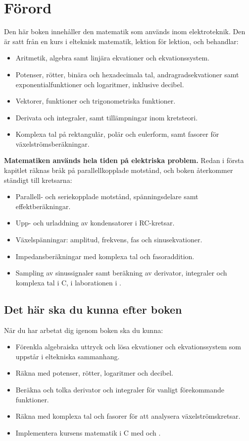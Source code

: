 
\chapter{Förord}

Den här boken innehåller den matematik som används inom elektroteknik. Den är satt från en kurs i
elteknisk matematik, lektion för lektion, och behandlar:
\begin{itemize}
  \item Aritmetik, algebra samt linjära ekvationer och ekvationssystem.
  \item Potenser, rötter, binära och hexadecimala tal, andragradsekvationer samt
    exponentialfunktioner och logaritmer, inklusive decibel.
  \item Vektorer, funktioner och trigonometriska funktioner.
  \item Derivata och integraler, samt tillämpningar inom kretsteori.
  \item Komplexa tal på rektangulär, polär och eulerform, samt fasorer för
    växelströmsberäkningar.
\end{itemize}

\textbf{Matematiken används hela tiden på elektriska problem.} Redan i första kapitlet räknas
bråk på parallellkopplade motstånd, och boken återkommer ständigt till kretsarna:
\begin{itemize}
  \item Parallell- och seriekopplade motstånd, spänningsdelare samt effektberäkningar.
  \item Upp- och urladdning av kondensatorer i RC-kretsar.
  \item Växelspänningar: amplitud, frekvens, fas och sinusekvationer.
  \item Impedansberäkningar med komplexa tal och fasoraddition.
  \item Sampling av sinussignaler samt beräkning av derivator, integraler och komplexa tal i C,
    i laborationen i .
\end{itemize}

\section*{Det här ska du kunna efter boken}
När du har arbetat dig igenom boken ska du kunna:
\begin{itemize}
  \item Förenkla algebraiska uttryck och lösa ekvationer och ekvationssystem som uppstår i
    eltekniska sammanhang.
  \item Räkna med potenser, rötter, logaritmer och decibel.
  \item Beräkna och tolka derivator och integraler för vanligt förekommande funktioner.
  \item Räkna med komplexa tal och fasorer för att analysera växelströmskretsar.
  \item Implementera kursens matematik i C med  och .
\end{itemize}

